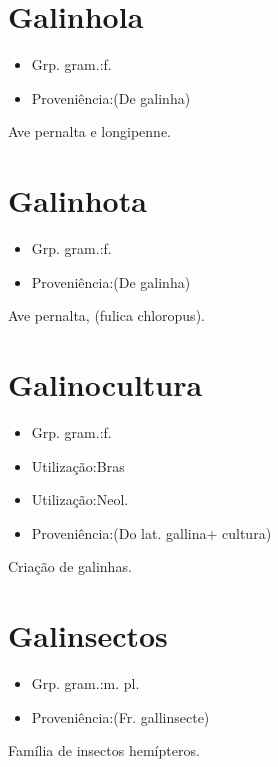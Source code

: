 \section{Galinhola}
\begin{itemize}
\item {Grp. gram.:f.}
\end{itemize}
\begin{itemize}
\item {Proveniência:(De \textunderscore galinha\textunderscore )}
\end{itemize}
Ave pernalta e longipenne.
\section{Galinhota}
\begin{itemize}
\item {Grp. gram.:f.}
\end{itemize}
\begin{itemize}
\item {Proveniência:(De \textunderscore galinha\textunderscore )}
\end{itemize}
Ave pernalta, (\textunderscore fulica chloropus\textunderscore ).
\section{Galinocultura}
\begin{itemize}
\item {Grp. gram.:f.}
\end{itemize}
\begin{itemize}
\item {Utilização:Bras}
\end{itemize}
\begin{itemize}
\item {Utilização:Neol.}
\end{itemize}
\begin{itemize}
\item {Proveniência:(Do lat. \textunderscore gallina\textunderscore  + \textunderscore cultura\textunderscore )}
\end{itemize}
Criação de galinhas.
\section{Galinsectos}
\begin{itemize}
\item {Grp. gram.:m. pl.}
\end{itemize}
\begin{itemize}
\item {Proveniência:(Fr. \textunderscore gallinsecte\textunderscore )}
\end{itemize}
Família de insectos hemípteros.
